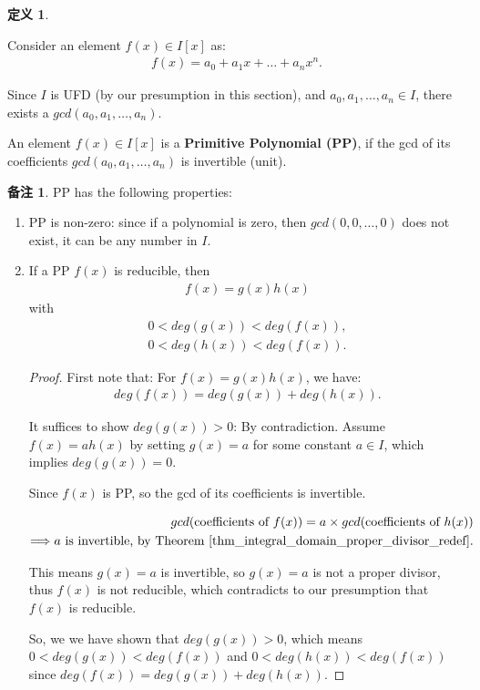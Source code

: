\documentclass[utf8]{ctexbook}
\theoremstyle{definition}
\newtheorem{protodefinition}{定义}[section]
\newenvironment{definition}
   {\colorlet{shadecolor}{black!15}\begin{shaded}\begin{protodefinition}}
   {\end{protodefinition}\end{shaded}}
\newtheorem{memo}{备注}[section]
\begin{document}
\begin{definition}
\label{def_poly_PP}

Consider an element $f(x) \in I[x]$ as:
\begin{align}
f(x) = a_0 + a_1 x + \ldots + a_n x^n . 
\end{align}

Since $I$ is UFD (by our presumption in this section), and $a_0, a_1, \ldots, a_n \in I$, there exists a $gcd(a_0, a_1, \ldots , a_n)$. 

An element $f(x) \in I[x]$ is a \textbf{Primitive Polynomial (PP)}, if the gcd of its coefficients $gcd(a_0, a_1, \ldots , a_n)$ is invertible (unit).
\end{definition}

\begin{memo}\label{memo_Factor_poly_ring_PP_property}
PP has the following properties:
\begin{enumerate}
\item{PP is non-zero: since if a polynomial is zero, then $gcd(0,0,\ldots,0)$ does not exist, it can be any number in $I$. \label{memo_Factor_poly_ring_PP_property_1}
}
\item{\label{memo_Factor_poly_ring_PP_property_2}
If a PP $f(x)$ is reducible, then
\begin{align}
f(x) = g(x) h(x)
\end{align}
with 
\begin{align*}
0 < deg(g(x)) < deg(f(x)), \\
0 < deg(h(x)) < deg(f(x)). 
\end{align*}

\begin{proof}
First note that: For $f(x) = g(x) h(x)$, we have:
\begin{align*}
deg(f(x)) = deg(g(x)) + deg(h(x)) .
\end{align*}

It suffices to show $deg(g(x)) > 0$: By contradiction. Assume $f(x) = a h(x)$ by setting $g(x) = a$ for some constant $a \in I$, which implies $deg(g(x)) = 0$.

Since $f(x)$ is PP, so the gcd of its coefficients is invertible.

\begin{align*}
gcd(\mbox{coefficients of } f(x)) = a \times gcd(\mbox{coefficients of } h(x) ) \\
\Longrightarrow a \mbox{ is invertible, by Theorem \ref{thm_integral_domain_proper_divisor_redef}}.
\end{align*}  

This means $g(x) = a$ is invertible, so $g(x)=a$ is not a proper divisor, thus $f(x)$ is not reducible, which contradicts to our presumption that $f(x)$ is reducible. 

So, we we have shown that $deg(g(x)) > 0$, which means $0 < deg(g(x)) < deg(f(x))$ and $0 < deg(h(x)) < deg(f(x))$ since $deg(f(x)) = deg(g(x)) + deg(h(x))$.

\end{proof}
}
\end{enumerate}
\end{memo}
\end{document}
